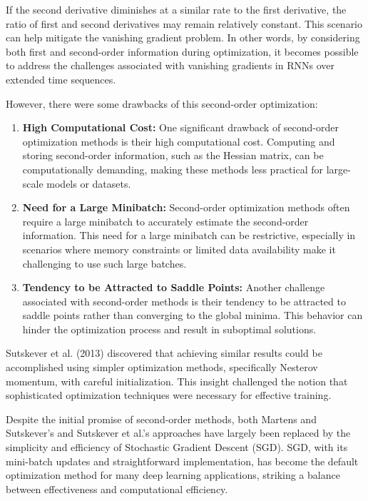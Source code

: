 \documentclass{report}
\begin{document}
If the second derivative diminishes at a similar rate to the first derivative, the ratio of first and second derivatives may remain relatively constant. This scenario can help mitigate the vanishing gradient problem. In other words, by considering both first and second-order information during optimization, it becomes possible to address the challenges associated with vanishing gradients in RNNs over extended time sequences.

However, there were some drawbacks of this second-order optimization:

\begin{enumerate}[label=\arabic*.]
  \item \textbf{High Computational Cost:}
One significant drawback of second-order optimization methods is their high computational cost. Computing and storing second-order information, such as the Hessian matrix, can be computationally demanding, making these methods less practical for large-scale models or datasets.

  \item \textbf{Need for a Large Minibatch:}
Second-order optimization methods often require a large minibatch to accurately estimate the second-order information. This need for a large minibatch can be restrictive, especially in scenarios where memory constraints or limited data availability make it challenging to use such large batches.

  \item \textbf{Tendency to be Attracted to Saddle Points:}
Another challenge associated with second-order methods is their tendency to be attracted to saddle points rather than converging to the global minima. This behavior can hinder the optimization process and result in suboptimal solutions.

\end{enumerate}

Sutskever et al. (2013) discovered that achieving similar results could be accomplished using simpler optimization methods, specifically Nesterov momentum, with careful initialization. This insight challenged the notion that sophisticated optimization techniques were necessary for effective training.

Despite the initial promise of second-order methods, both Martens and Sutskever's and Sutskever et al.'s approaches have largely been replaced by the simplicity and efficiency of Stochastic Gradient Descent (SGD). SGD, with its mini-batch updates and straightforward implementation, has become the default optimization method for many deep learning applications, striking a balance between effectiveness and computational efficiency.
\end{document}
